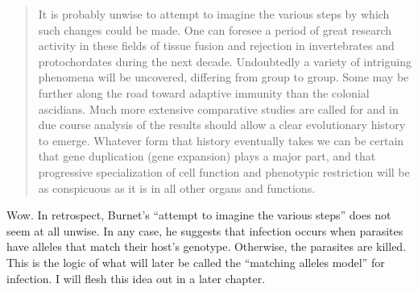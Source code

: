 \documentclass[
  letterpaper,
]{book}
\begin{document}
\begin{quote}
It is probably unwise to attempt to imagine the various steps by which
such changes could be made. One can foresee a period of great research
activity in these fields of tissue fusion and rejection in invertebrates
and protochordates during the next decade. Undoubtedly a variety of
intriguing phenomena will be uncovered, differing from group to group.
Some may be further along the road toward adaptive immunity than the
colonial ascidians. Much more extensive comparative studies are called
for and in due course analysis of the results should allow a clear
evolutionary history to emerge. Whatever form that history eventually
takes we can be certain that gene duplication (gene expansion) plays a
major part, and that progressive specialization of cell function and
phenotypic restriction will be as conspicuous as it is in all other
organs and functions.
\end{quote}

Wow. In retrospect, Burnet's ``attempt to imagine the various steps''
does not seem at all unwise. In any case, he suggests that infection
occurs when parasites have alleles that match their host's genotype.
Otherwise, the parasites are killed. This is the logic of what will
later be called the ``matching alleles model'' for infection. I will
flesh this idea out in a later chapter.
\end{document}
